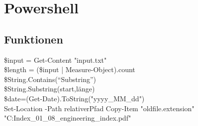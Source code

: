 \chapter{Powershell}\label{chap:Powershell}
\section{Funktionen}
\$input = Get-Content "input.txt"\\
\$length = (\$input | Measure-Object).count\\
\$String.Contains(\enquote{Substring})\\
\$String.Substring(start,länge)\\
\$date=(Get-Date).ToString("yyyy\_MM\_dd")\\
Set-Location -Path relativerPfad
Copy-Item "oldfile.extension" "C:\Users\Maurice\Documents\Engineering Index_01_08_engineering_index.pdf"